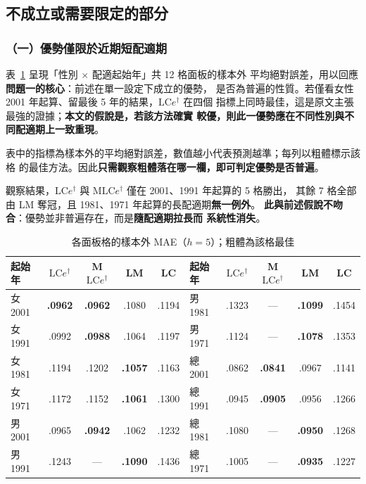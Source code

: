 \documentclass[UTF8, fontset=macnew, a4paper, 12pt]{ctexart}
\newcommand{\LCe}{\mathrm{LC}e^{\dagger}}
\begin{document}
\subsection{不成立或需要限定的部分}

\subsubsection{（一）優勢僅限於近期短配適期}\label{sec:window}

表~\ref{tab:panel} 呈現「性別 $\times$ 配適起始年」共 12 格面板的樣本外
平均絕對誤差，用以回應\textbf{問題一的核心}：前述在單一設定下成立的優勢，
是否為普遍的性質。若僅看女性 2001 年起算、留最後 5 年的結果，$\LCe$ 在四個
指標上同時最佳，這是原文主張最強的證據；\textbf{本文的假說是，若該方法確實
較優，則此一優勢應在不同性別與不同配適期上一致重現}。

表中的指標為樣本外的平均絕對誤差，數值越小代表預測越準；每列以粗體標示該格
的最佳方法。因此\textbf{只需觀察粗體落在哪一欄，即可判定優勢是否普遍}。

觀察結果，$\LCe$ 與 M$\LCe$ 僅在 2001、1991 年起算的 5 格勝出，
其餘 7 格全部由 LM 奪冠，且 1981、1971 年起算的長配適期\textbf{無一例外}。
\textbf{此與前述假說不吻合}：優勢並非普遍存在，而是\textbf{隨配適期拉長而
系統性消失}。

\begin{table}[H]
\centering
\caption{各面板格的樣本外 MAE（$h=5$）；粗體為該格最佳}
\small
\begin{tabular}{lcccc@{\hspace{14pt}}lcccc}
\toprule
起始年 & $\LCe$ & M$\LCe$ & LM & LC & 起始年 & $\LCe$ & M$\LCe$ & LM & LC\\
\midrule
女 2001 & \textbf{.0962} & \textbf{.0962} & .1080 & .1194 & 男 1981 & .1323 & --- & \textbf{.1099} & .1454\\
女 1991 & .0992 & \textbf{.0988} & .1064 & .1197 & 男 1971 & .1124 & --- & \textbf{.1078} & .1353\\
女 1981 & .1194 & .1202 & \textbf{.1057} & .1163 & 總 2001 & .0862 & \textbf{.0841} & .0967 & .1141\\
女 1971 & .1172 & .1152 & \textbf{.1061} & .1300 & 總 1991 & .0945 & \textbf{.0905} & .0956 & .1266\\
男 2001 & .0965 & \textbf{.0942} & .1062 & .1232 & 總 1981 & .1080 & --- & \textbf{.0950} & .1268\\
男 1991 & .1243 & --- & \textbf{.1090} & .1436 & 總 1971 & .1005 & --- & \textbf{.0935} & .1227\\
\bottomrule
\end{tabular}
\label{tab:panel}
\end{table}
\end{document}
